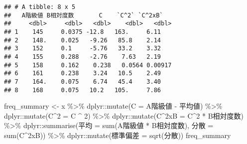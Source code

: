 \documentclass[
  12pt,
]{book}
\newenvironment{Shaded}{\begin{snugshade}}{\end{snugshade}}
\newcommand{\AttributeTok}[1]{\textcolor[rgb]{0.77,0.63,0.00}{#1}}
\newcommand{\DecValTok}[1]{\textcolor[rgb]{0.00,0.00,0.81}{#1}}
\newcommand{\FunctionTok}[1]{\textcolor[rgb]{0.00,0.00,0.00}{#1}}
\newcommand{\NormalTok}[1]{#1}
\newcommand{\OtherTok}[1]{\textcolor[rgb]{0.56,0.35,0.01}{#1}}
\newcommand{\SpecialCharTok}[1]{\textcolor[rgb]{0.00,0.00,0.00}{#1}}
\newcommand{\StringTok}[1]{\textcolor[rgb]{0.31,0.60,0.02}{#1}}
\begin{document}
\begin{verbatim}
## # A tibble: 8 x 5
##   A階級値 B相対度数       C    `C^2` `C^2xB`
##     <dbl>     <dbl>   <dbl>    <dbl>   <dbl>
## 1    145     0.0375 -12.8   163.     6.11   
## 2    148.    0.025   -9.26   85.8    2.14   
## 3    152     0.1     -5.76   33.2    3.32   
## 4    155     0.288   -2.76    7.63   2.19   
## 5    158     0.162    0.238   0.0564 0.00917
## 6    161     0.238    3.24   10.5    2.49   
## 7    164.    0.075    6.74   45.4    3.40   
## 8    168     0.075   10.2   105.     7.86
\end{verbatim}

\begin{Shaded}
\begin{Highlighting}[]
\NormalTok{freq\_summary }\OtherTok{\textless{}{-}}\NormalTok{ x }\SpecialCharTok{\%\textgreater{}\%} 
\NormalTok{  dplyr}\SpecialCharTok{::}\FunctionTok{mutate}\NormalTok{(}\StringTok{\textasciigrave{}}\AttributeTok{C}\StringTok{\textasciigrave{}} \OtherTok{=} \StringTok{\textasciigrave{}}\AttributeTok{A階級値}\StringTok{\textasciigrave{}} \SpecialCharTok{{-}} \StringTok{\textasciigrave{}}\AttributeTok{平均値}\StringTok{\textasciigrave{}}\NormalTok{) }\SpecialCharTok{\%\textgreater{}\%} 
\NormalTok{  dplyr}\SpecialCharTok{::}\FunctionTok{mutate}\NormalTok{(}\StringTok{\textasciigrave{}}\AttributeTok{C\^{}2}\StringTok{\textasciigrave{}} \OtherTok{=} \StringTok{\textasciigrave{}}\AttributeTok{C}\StringTok{\textasciigrave{}} \SpecialCharTok{\^{}} \DecValTok{2}\NormalTok{) }\SpecialCharTok{\%\textgreater{}\%} 
\NormalTok{  dplyr}\SpecialCharTok{::}\FunctionTok{mutate}\NormalTok{(}\StringTok{\textasciigrave{}}\AttributeTok{C\^{}2xB}\StringTok{\textasciigrave{}} \OtherTok{=} \StringTok{\textasciigrave{}}\AttributeTok{C\^{}2}\StringTok{\textasciigrave{}} \SpecialCharTok{*} \StringTok{\textasciigrave{}}\AttributeTok{B相対度数}\StringTok{\textasciigrave{}}\NormalTok{) }\SpecialCharTok{\%\textgreater{}\%} 
\NormalTok{  dplyr}\SpecialCharTok{::}\FunctionTok{summarise}\NormalTok{(}\StringTok{\textasciigrave{}}\AttributeTok{平均}\StringTok{\textasciigrave{}} \OtherTok{=} \FunctionTok{sum}\NormalTok{(}\StringTok{\textasciigrave{}}\AttributeTok{A階級値}\StringTok{\textasciigrave{}} \SpecialCharTok{*} \StringTok{\textasciigrave{}}\AttributeTok{B相対度数}\StringTok{\textasciigrave{}}\NormalTok{),}
                   \StringTok{\textasciigrave{}}\AttributeTok{分散}\StringTok{\textasciigrave{}} \OtherTok{=} \FunctionTok{sum}\NormalTok{(}\StringTok{\textasciigrave{}}\AttributeTok{C\^{}2xB}\StringTok{\textasciigrave{}}\NormalTok{)) }\SpecialCharTok{\%\textgreater{}\%} 
\NormalTok{  dplyr}\SpecialCharTok{::}\FunctionTok{mutate}\NormalTok{(}\StringTok{\textasciigrave{}}\AttributeTok{標準偏差}\StringTok{\textasciigrave{}} \OtherTok{=} \FunctionTok{sqrt}\NormalTok{(}\StringTok{\textasciigrave{}}\AttributeTok{分散}\StringTok{\textasciigrave{}}\NormalTok{))}
\NormalTok{freq\_summary}
\end{Highlighting}
\end{Shaded}
\end{document}
